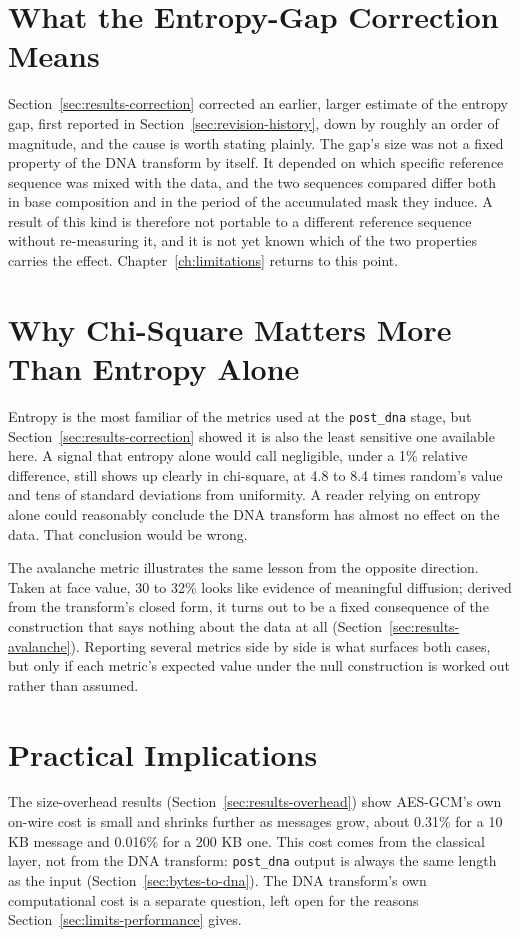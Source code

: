 \documentclass[12pt,a4paper,twoside]{report}
\numberwithin{equation}{chapter}
\begin{document}
\section{What the Entropy-Gap Correction Means}
Section~\ref{sec:results-correction} corrected an earlier, larger
estimate of the entropy gap, first reported in
Section~\ref{sec:revision-history}, down by roughly an order of
magnitude, and the cause is worth stating plainly. The gap's size was
not a fixed property of the DNA transform by itself. It depended on
which specific reference sequence was mixed with the data, and the two
sequences compared differ both in base composition and in the period of
the accumulated mask they induce. A result of this kind is therefore
not portable to a different reference sequence without re-measuring it,
and it is not yet known which of the two properties carries the effect.
Chapter~\ref{ch:limitations} returns to this point.

\section{Why Chi-Square Matters More Than Entropy Alone}
Entropy is the most familiar of the metrics used at the
\texttt{post\_dna} stage, but Section~\ref{sec:results-correction}
showed it is also the least sensitive one available here. A signal
that entropy alone would call negligible, under a 1\% relative
difference, still shows up clearly in chi-square, at 4.8 to 8.4 times
random's value and tens of standard deviations from uniformity. A
reader relying on entropy alone could reasonably conclude the DNA
transform has almost no effect on the data. That conclusion would be
wrong.

The avalanche metric illustrates the same lesson from the opposite
direction. Taken at face value, 30 to 32\% looks like evidence of
meaningful diffusion; derived from the transform's closed form, it
turns out to be a fixed consequence of the construction that says
nothing about the data at all (Section~\ref{sec:results-avalanche}).
Reporting several metrics side by side is what surfaces both cases, but
only if each metric's expected value under the null construction is
worked out rather than assumed.

\section{Practical Implications}
The size-overhead results
(Section~\ref{sec:results-overhead}) show AES-GCM's own on-wire cost is
small and shrinks further as messages grow, about 0.31\% for a 10 KB
message and 0.016\% for a 200 KB one. This cost comes from the
classical layer, not from the DNA transform: \texttt{post\_dna} output
is always the same length as the input
(Section~\ref{sec:bytes-to-dna}). The DNA transform's own computational
cost is a separate question, left open for the reasons
Section~\ref{sec:limits-performance} gives.
\end{document}
